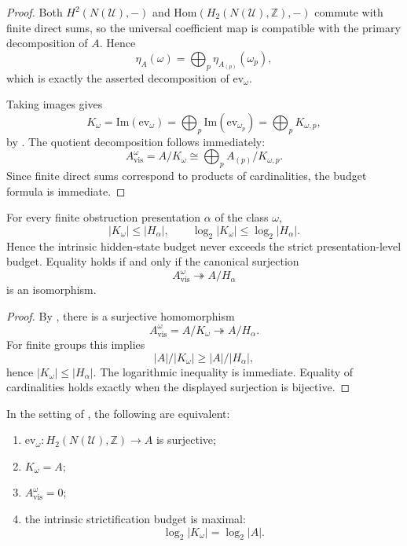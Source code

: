\begin{proof}
Both $H^2(N(\mathcal U),-)$ and $\mathrm{Hom}(H_2(N(\mathcal U),\mathbb Z),-)$ commute with finite direct sums, so the universal coefficient map is compatible with the primary decomposition of $A$. Hence
\[
\eta_A(\omega)=\bigoplus_p \eta_{A_{(p)}}(\omega_p),
\]
which is exactly the asserted decomposition of $\mathrm{ev}_{\omega}$.

Taking images gives
\[
K_{\omega}
=
\mathrm{Im}(\mathrm{ev}_{\omega})
=
\bigoplus_p \mathrm{Im}(\mathrm{ev}_{\omega_p})
=
\bigoplus_p K_{\omega,p},
\]
by . The quotient decomposition follows immediately:
\[
A_{\mathrm{vis}}^{\omega}
=
A/K_{\omega}
\cong
\bigoplus_p A_{(p)}/K_{\omega,p}.
\]
Since finite direct sums correspond to products of cardinalities, the budget formula is immediate.
\end{proof}

\begin{corollary}\label{cor:strict-intrinsic-budget-comparison}
For every finite obstruction presentation $\alpha$ of the class $\omega$,
\[
|K_{\omega}|\le |H_\alpha|,
\qquad
\log_2|K_{\omega}|\le \log_2|H_\alpha|.
\]
Hence the intrinsic hidden-state budget never exceeds the strict presentation-level budget. Equality holds if and only if the canonical surjection
\[
A_{\mathrm{vis}}^{\omega}\twoheadrightarrow A/H_\alpha
\]
is an isomorphism.
\end{corollary}

\begin{proof}
By , there is a surjective homomorphism
\[
A_{\mathrm{vis}}^{\omega}=A/K_{\omega}\twoheadrightarrow A/H_\alpha.
\]
For finite groups this implies
\[
|A|/|K_{\omega}|\ge |A|/|H_\alpha|,
\]
hence $|K_{\omega}|\le |H_\alpha|$. The logarithmic inequality is immediate. Equality of cardinalities holds exactly when the displayed surjection is bijective.
\end{proof}

\begin{corollary}\label{cor:maximal-collapse}
In the setting of , the following are equivalent:
\begin{enumerate}[label=(\roman*),nosep]
\item $\mathrm{ev}_{\omega}:H_2(N(\mathcal U),\mathbb Z)\to A$ is surjective;
\item $K_{\omega}=A$;
\item $A_{\mathrm{vis}}^{\omega}=0$;
\item the intrinsic strictification budget is maximal:
\[
\log_2|K_{\omega}|=\log_2|A|.
\]
\end{enumerate}
\end{corollary}

